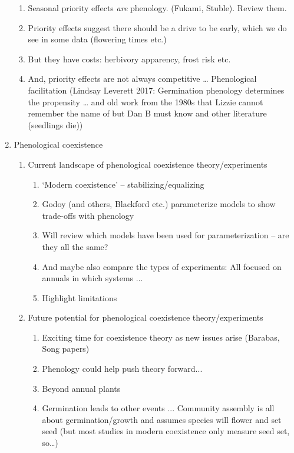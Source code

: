 \documentclass[11pt,letter]{article}
\begin{document}
\begin{enumerate}
\begin{enumerate}
\item Seasonal priority effects \emph{are} phenology. (Fukami, Stuble). Review them.
\item Priority effects suggest there should be a drive to be early, which we do see in some data (flowering times etc.) %
\item But they have costs: herbivory apparency, frost risk etc. 
\item And, priority effects are not always competitive … Phenological facilitation (Lindsay Leverett 2017: Germination phenology determines the propensity … and old work from the 1980s that Lizzie cannot remember the name of but Dan B must know and other literature (seedlings die))
\end{enumerate}
\item Phenological coexistence
\begin{enumerate}
\item Current landscape of phenological coexistence theory/experiments
\begin{enumerate}
\item `Modern coexistence' -- stabilizing/equalizing 
\item Godoy (and others, Blackford etc.) parameterize models to show trade-offs with phenology %
\item Will review which models have been used for parameterization -- are they all the same?
\item And maybe also compare the types of experiments: All focused on annuals in  which systems ...
\item Highlight limitations %
\end{enumerate}
\item Future potential for phenological coexistence theory/experiments
\begin{enumerate}
\item Exciting time for coexistence theory as new issues arise (Barabas, Song papers)
\item Phenology could help push theory forward...
\item Beyond annual plants 
\item Germination leads to other events ... Community assembly is all about germination/growth and assumes species will flower and set seed (but most studies in modern coexistence only measure seed set, so…)

\end{enumerate}
\end{enumerate}
\end{enumerate}
\end{document}
